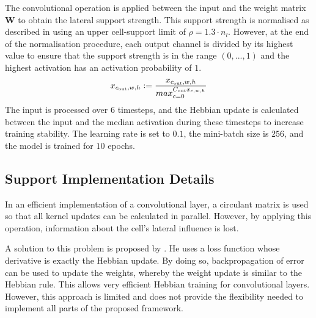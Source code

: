 The convolutional operation is applied between the input and the weight matrix $\boldsymbol{W}$ to obtain the lateral support strength.
This support strength is normalised as described in  using an upper cell-support limit of $\rho = 1.3 \cdot n_l$.
However, at the end of the normalisation procedure, each output channel is divided by its highest value to ensure that the support strength is in the range $(0, ..., 1)$ and the highest activation has an activation probability of $1$.
%
\begin{align}\eqlbl{exp_norm}
	x_{c_{\text{out}},w,h} := \frac{x_{c_{\text{out}},w,h}}{max_{c=0}^{C_{\text{out}} x_{c,w,h}}}
\end{align}
%
The input is processed over $6$ timesteps, and the Hebbian update is calculated between the input and the median activation during these timesteps to increase training stability.
The learning rate is set to $0.1$, the mini-batch size is $256$, and the model is trained for $10$ epochs.



\subsection{Support Implementation Details}
In an efficient implementation of a convolutional layer, a circulant matrix is used so that all kernel updates can be calculated in parallel. However, by applying this operation, information about the cell's lateral influence is lost.

A solution to this problem is proposed by . He uses a loss function whose derivative is exactly the Hebbian update. By doing so, backpropagation of error can be used to update the weights, whereby the weight update is similar to the Hebbian rule.
This allows very efficient Hebbian training for convolutional layers.
However, this approach is limited and does not provide the flexibility needed to implement all parts of the proposed framework.

